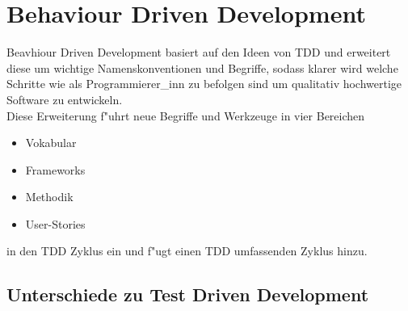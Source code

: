\section{Behaviour Driven Development}
  Beavhiour Driven Development basiert auf den Ideen von TDD und erweitert diese
  um wichtige Namenskonventionen und Begriffe, sodass klarer wird welche Schritte
  wie als Programmierer\_inn zu befolgen sind um qualitativ hochwertige Software
  zu entwickeln.\\
  Diese Erweiterung f"uhrt neue Begriffe und Werkzeuge in vier Bereichen
  \begin{itemize}
    \item Vokabular
    \item Frameworks
    \item Methodik
    \item User-Stories
  \end{itemize}
  in den TDD Zyklus ein und f"ugt einen TDD umfassenden Zyklus hinzu.

  \subsection{Unterschiede zu Test Driven Development}
